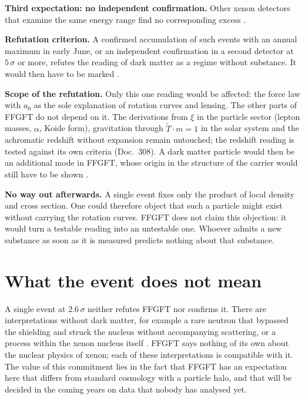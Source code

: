 \textbf{Third expectation: no independent confirmation.} Other xenon detectors that examine the same
energy range find no corresponding excess \SM.

\textbf{Refutation criterion.} A confirmed accumulation of such events with an annual maximum in early
June, or an independent confirmation in a second detector at $5\,\sigma$ or more, refutes the
reading of dark matter as a regime without substance. It would then have to be marked \XM.

\textbf{Scope of the refutation.} Only this one reading would be affected: the force law with $a_0$
as the sole explanation of rotation curves and lensing. The other parts of FFGFT do not depend on it.
The derivations from $\xi$ in the particle sector (lepton masses, $\alpha$, Koide form), gravitation
through $\tilde T\cdot m=1$ in the solar system and the achromatic redshift without expansion remain
untouched; the redshift reading is tested against its own criteria (Doc.~308). A dark matter
particle would then be an additional mode in FFGFT, whose origin in the structure of the carrier
would still have to be shown \SM.

\textbf{No way out afterwards.} A single event fixes only the product of local density and cross
section. One could therefore object that such a particle might exist without carrying the rotation
curves. FFGFT does not claim this objection: it would turn a testable reading into an untestable
one. Whoever admits a new substance as soon as it is measured predicts nothing about that substance.

\section{What the event does not mean}

A single event at $2.6\,\sigma$ neither refutes FFGFT nor confirms it. There are interpretations
without dark matter, for example a rare neutron that bypassed the shielding and struck the nucleus
without accompanying scattering, or a process within the xenon nucleus itself \QM. FFGFT says
nothing of its own about the nuclear physics of xenon; each of these interpretations is compatible
with it. The value of this commitment lies in the fact that FFGFT has an expectation here that
differs from standard cosmology with a particle halo, and that will be decided in the coming years
on data that nobody has analysed yet.

